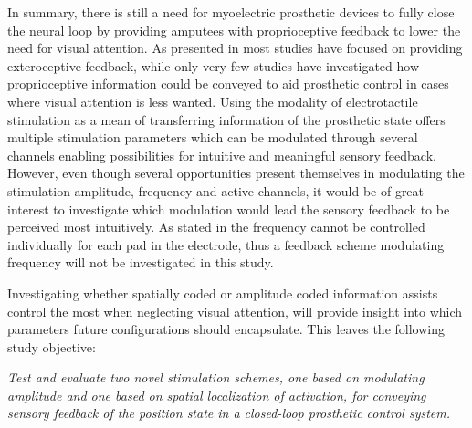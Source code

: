 

In summary, there is still a need for myoelectric prosthetic devices to fully close the neural loop by providing amputees with proprioceptive feedback to lower the need for visual attention. As presented in  most studies have focused on providing exteroceptive feedback, while only very few studies have investigated how proprioceptive information could be conveyed to aid prosthetic control in cases where visual attention is less wanted. Using the modality of electrotactile stimulation as a mean of transferring information of the prosthetic state offers multiple stimulation parameters which can be modulated through several channels enabling possibilities for intuitive and meaningful sensory feedback. However, even though several opportunities present themselves in modulating the stimulation amplitude, frequency and active channels, it would be of great interest to investigate which modulation would lead the sensory feedback to be perceived most intuitively. As stated in  the frequency cannot be controlled individually for each pad in the electrode, thus a feedback scheme modulating frequency will not be investigated in this study. 

Investigating whether spatially coded or amplitude coded information assists control the most when neglecting visual attention, will provide insight into which parameters future configurations should encapsulate. This leaves the following study objective: 

\begin{center}
	\textit{Test and evaluate two novel stimulation schemes, one based on modulating amplitude and one based on spatial localization of activation, for conveying sensory feedback of the position state in a closed-loop prosthetic control system.}  
\end{center} 